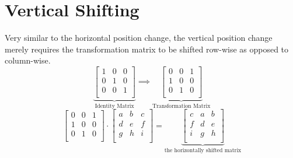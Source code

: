 \section{Vertical Shifting}

Very similar to the horizontal position change, the vertical position change
merely requires the transformation matrix to be shifted row-wise as opposed
to
column-wise.
\[
  \underbrace{
    \begin{bmatrix}
      1&0&0\\
      0&1&0\\
      0&0&1\\
    \end{bmatrix}
  }_{\text{Identity Matrix}}
  \implies
  \underbrace{
    \begin{bmatrix}
      0&0&1\\
      1&0&0\\
      0&1&0\\
    \end{bmatrix}
  }_{\text{Transformation
  Matrix}}
\]
\[ 
  \begin{bmatrix}
    0&0&1\\
    1&0&0\\
    0&1&0\\
  \end{bmatrix}
  \cdot
  \begin{bmatrix}
    a&b&c\\
    d&e&f\\
    g&h&i\\
  \end{bmatrix}
  =
  \underbrace{
    \begin{bmatrix}
      c&a&b\\
      f&d&e\\
      i&g&h\\
    \end{bmatrix}
  }_{\text{the
    horizontally
    shifted
  matrix}}
\]

